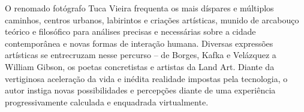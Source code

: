 O renomado fotógrafo Tuca Vieira frequenta os mais díspares e múltiplos caminhos, centros urbanos, labirintos e criações artísticas, munido de arcabouço teórico e filosófico para análises precisas e necessárias sobre a cidade contemporânea e novas formas de interação humana. Diversas expressões artísticas se entrecruzam nesse percurso – de Borges, Kafka e Velázquez a William Gibson, os poetas concretistas e artistas da Land Art. Diante da vertiginosa aceleração da vida e inédita realidade impostas pela tecnologia, o autor instiga novas possibilidades e percepções diante de uma experiência progressivamente calculada e enquadrada virtualmente. 

\vfill

\hspace*{-.4cm}\begin{minipage}[c]{.5\linewidth}
\small{
{}}
\end{minipage}

\pagebreak